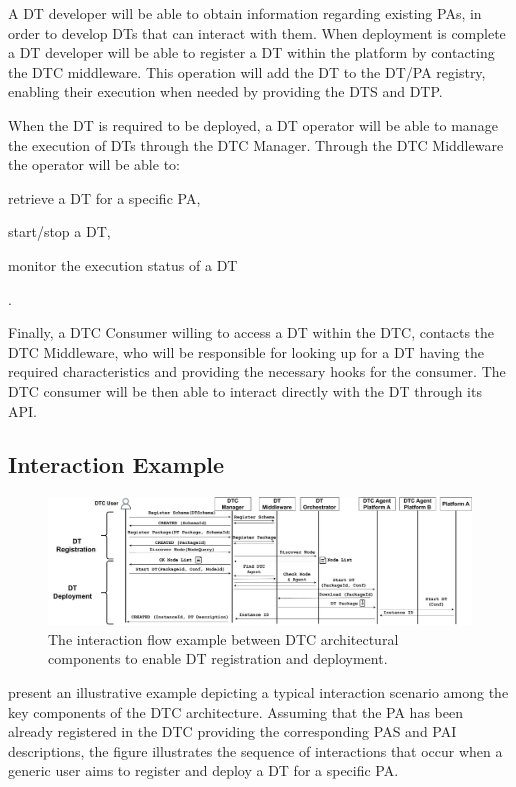 A DT developer will be able to obtain information regarding existing \acp{PA}, in order to develop DTs that can interact with them.
%
When deployment is complete a DT developer will be able to register a DT within the platform by contacting the DTC middleware. This operation will add the DT to the DT/\ac{PA} registry, enabling their execution when needed by providing the DTS and DTP.

When the \ac{DT} is required to be deployed, a DT operator will be able to manage the execution of \acp{DT} through the DTC Manager.
Through the DTC Middleware the operator will be able to: \begin{inlinelist}
    \item retrieve a DT for a specific PA,
    \item start/stop a DT,
    \item monitor the execution status of a DT
\end{inlinelist}.

Finally, a DTC Consumer willing to access a DT within the DTC, contacts the DTC Middleware, who will be responsible for looking up for a DT having the required characteristics and providing the necessary hooks for the consumer. The DTC consumer will be then able to interact directly with the DT through its API.


\subsection{Interaction Example}


\begin{figure}
    \centering
    \includegraphics[width=\textwidth]{figures/dtc/sequence_diagram.pdf}
    \caption{The interaction flow example between DTC architectural components to enable DT registration and deployment.}
    \label{fig:dtc-interaction}
\end{figure}

 present an illustrative example depicting a typical interaction scenario among the key components of the DTC architecture.
%
Assuming that the PA has been already registered in the DTC providing the corresponding PAS and PAI descriptions, the figure illustrates the sequence of interactions that occur when a generic user aims to register and deploy a DT for a specific PA.

